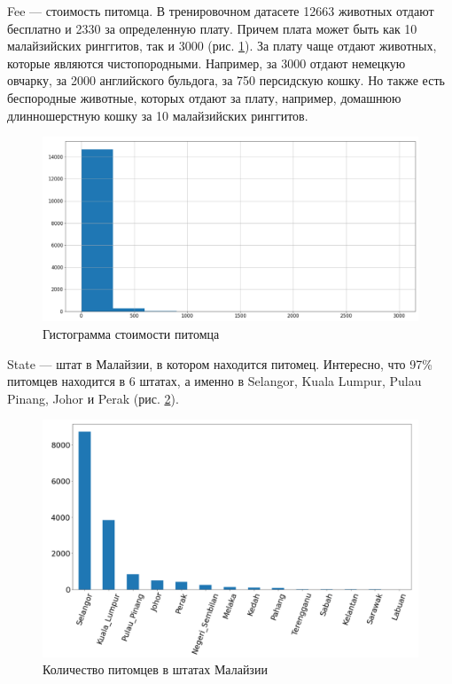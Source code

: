 \documentclass[14pt]{mmcs_article}
\begin{document}
Fee --- стоимость питомца. В тренировочном датасете 12663 животных отдают бесплатно и 2330 за определенную плату. Причем плата может быть как 10 малайзийских ринггитов, так и 3000 (рис. \ref{analyse:fee}). За плату чаще отдают животных, которые являются чистопородными. Например, за 3000 отдают немецкую овчарку, за 2000 английского бульдога, за 750 персидскую кошку. Но также есть беспородные животные, которых отдают за плату, например, домашнюю длинношерстную кошку за 10 малайзийских ринггитов.

\begin{figure}[H]
	\centering
	\includegraphics[scale=0.5]{fee.png}
	\caption{Гистограмма стоимости питомца}\label{analyse:fee}
\end{figure}

State --- штат в Малайзии, в котором находится питомец. Интересно, что 97\% питомцев находится в 6 штатах, а именно в Selangor, Kuala Lumpur, Pulau Pinang, Johor и Perak (рис. \ref{analyse:state}).

\begin{figure}[H]
	\centering
	\includegraphics[scale=0.5]{state.png}
	\caption{Количество питомцев в штатах Малайзии}\label{analyse:state}
\end{figure}
\end{document}
